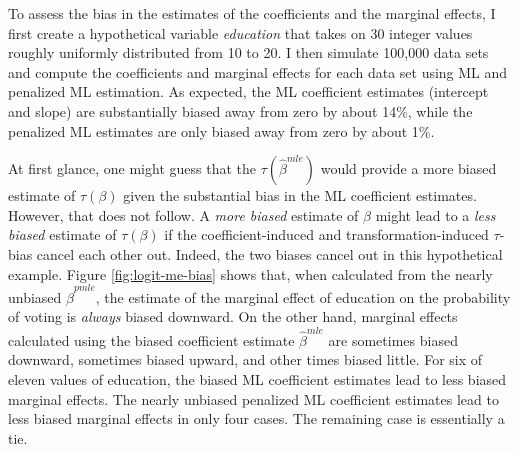 \documentclass[12pt]{article}
\begin{document}
To assess the bias in the estimates of the coefficients and the marginal effects, I first create a hypothetical variable \textit{education} that takes on 30 integer values roughly uniformly distributed from 10 to 20. 
I then simulate 100,000 data sets and compute the coefficients and marginal effects for each data set using ML and penalized ML estimation. 
As expected, the ML coefficient estimates (intercept and slope) are substantially biased away from zero by about 14\%, while the penalized ML estimates are only biased away from zero by about 1\%.

At first glance, one might guess that the $\tau(\hat{\beta}^{mle})$ would provide a more biased estimate of $\tau(\beta)$ given the substantial bias in the ML coefficient estimates. 
However, that does not follow. 
A \textit{more biased} estimate of $\beta$ might lead to a \textit{less biased} estimate of $\tau(\beta)$ if the coefficient-induced and transformation-induced $\tau$-bias cancel each other out. 
Indeed, the two biases cancel out in this hypothetical example. 
Figure \ref{fig:logit-me-bias} shows that, when calculated from the nearly unbiased $\hat{\beta}^{pmle}$, the estimate of the marginal effect of education on the probability of voting is \textit{always} biased downward. 
On the other hand, marginal effects calculated using the biased coefficient estimate $\hat{\beta}^{mle}$ are sometimes biased downward, sometimes biased upward, and other times biased little. 
For six of eleven values of education, the biased ML coefficient estimates lead to less biased marginal effects. 
The nearly unbiased penalized ML coefficient estimates lead to less biased marginal effects in only four cases. 
The remaining case is essentially a tie.
\end{document}

